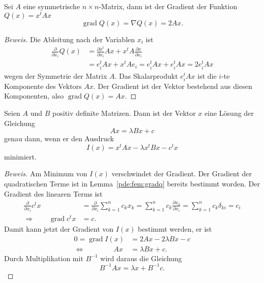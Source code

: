 \begin{lemma}
\label{pde:fem:gradq}
Sei $A$ eine symmetrische $n\times n$-Matrix, dann ist der Gradient der
Funktion $Q(x) = x^t Ax$
\[
\operatorname{grad}Q(x)
=
\nabla Q(x)
=
2Ax.
\]
\end{lemma}

\begin{proof}[Beweis]
Die Ableitung nach der Variablen $x_i$ ist
\begin{align*}
\frac{\partial}{\partial x_i} Q(x)
&=
\frac{\partial x^t}{\partial x_i} Ax
+
x^t A \frac{\partial x}{\partial x_i}
\\
&=
e_i^t Ax
+
x^tAe_i
=
e_i^t Ax
+
e_i^t Ax
=
2e_i^t Ax
\end{align*}
wegen der Symmetrie der Matrix $A$.
Das Skalarprodukt $e_i^t Ax$ ist die $i$-te Komponente des Vektors $Ax$.
Der Gradient ist der Vektor bestehend aus diesen Komponenten, also
$\operatorname{grad}Q(x) = Ax$.
\end{proof}

\begin{satz}
Seien $A$ und $B$ positiv definite Matrizen.
Dann ist der Vektor $x$ eine Lösung der Gleichung
\[
Ax=\lambda Bx+c
\]
genau dann, wenn er den Ausdruck
\[
I(x)
=
x^tAx - \lambda x^tBx - c^tx
\]
minimiert.
\end{satz}

\begin{proof}[Beweis]
Am Minimum von $I(x)$ verschwindet der Gradient.
Der Gradient der quadratischen Terme ist in Lemma~\ref{pde:fem:gradq}
bereits bestimmt worden.
Der Gradient des linearen Terms ist
\begin{align*}
\frac{\partial}{\partial x_i}c^tx
&=
\frac{\partial}{\partial x_i}\sum_{k=1}^n c_kx_k
=
\sum_{k=1}^n c_k\frac{\partial x_k}{\partial x_i}
=
\sum_{k=1}^n c_k\delta_{ki}
=
c_i
\\
\Rightarrow\qquad
\operatorname{grad}c^tx&=c.
\end{align*}
Damit kann jetzt der Gradient von $I(x)$ bestimmt werden, er ist
\begin{align*}
0=\operatorname{grad}I(x)
&=
2Ax - 2\lambda Bx - c
\\
\Leftrightarrow
\qquad
\qquad
Ax&=\lambda Bx+c.
\end{align*}
Durch Multiplikation mit $B^{-1}$ wird daraus die Gleichung
\[
B^{-1}Ax=\lambda x + B^{-1}c.
\]
\end{proof}





